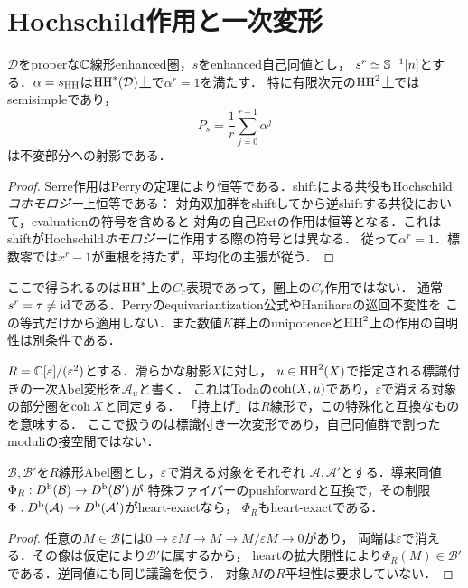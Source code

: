 \section{Hochschild作用と一次変形}
\label{sec:hh}
\begin{proposition}[有限位数のHochschild作用]\label{prop:finite-hh}
$\mathcal D$をproperな$\mathbb C$線形enhanced圏，$s$をenhanced自己同値とし，
$s^r\simeq\mathbb S^{-1}[n]$とする．$\alpha=s_{\operatorname{HH}}$は$\operatorname{HH}^*(\mathcal D)$上で$\alpha^r=1$を満たす．
特に有限次元の$\operatorname{HH}^2$上ではsemisimpleであり，
\[
 P_s=\frac1r\sum_{j=0}^{r-1}\alpha^j
\]
は不変部分への射影である．
\end{proposition}
\begin{proof}
Serre作用はPerryの定理により恒等である．shiftによる共役もHochschild\emph{コホモロジー}上恒等である：
対角双加群をshiftしてから逆shiftする共役において，evaluationの符号を含めると
対角の自己Extの作用は恒等となる．これはshiftがHochschild\emph{ホモロジー}に作用する際の符号とは異なる．
従って$\alpha^r=1$．標数零では$x^r-1$が重根を持たず，平均化の主張が従う．
\end{proof}

\begin{remark}\label{rem:not-cyclic}
ここで得られるのは$\operatorname{HH}^*$上の$C_r$表現であって，圏上の$C_r$作用ではない．
通常$s^r=\tau\ne\operatorname{id}$である．Perryのequivariantization公式やHaniharaの巡回不変性を
この等式だけから適用しない．また数値$K$群上のunipotenceと$\operatorname{HH}^2$上の作用の自明性は別条件である．
\end{remark}

$R=\mathbb C[\varepsilon]/(\varepsilon^2)$とする．滑らかな射影$X$に対し，
$u\in\operatorname{HH}^2(X)$で指定される標識付きの一次Abel変形を$\mathcal A_u$と書く．
これはTodaの$\operatorname{coh}(X,u)$であり，$\varepsilon$で消える対象の部分圏を$\operatorname{coh} X$と同定する．
「持上げ」は$R$線形で，この特殊化と互換なものを意味する．
ここで扱うのは標識付き一次変形であり，自己同値群で割ったmoduliの接空間ではない．

\begin{lemma}\label{lem:heart}
$\mathcal B,\mathcal B'$を$R$線形Abel圏とし，$\varepsilon$で消える対象をそれぞれ
$\mathcal A,\mathcal A'$とする．導来同値$\Phi_R:D^{\mathrm b}(\mathcal B)\to D^{\mathrm b}(\mathcal B')$が
特殊ファイバーのpushforwardと互換で，その制限$\Phi:D^{\mathrm b}(\mathcal A)\to D^{\mathrm b}(\mathcal A')$がheart-exactなら，
$\Phi_R$もheart-exactである．
\end{lemma}
\begin{proof}
任意の$M\in\mathcal B$には$0\to\varepsilon M\to M\to M/\varepsilon M\to0$があり，
両端は$\varepsilon$で消える．その像は仮定により$\mathcal B'$に属するから，
heartの拡大閉性により$\Phi_R(M)\in\mathcal B'$である．逆同値にも同じ議論を使う．
対象$M$の$R$平坦性は要求していない．
\end{proof}

